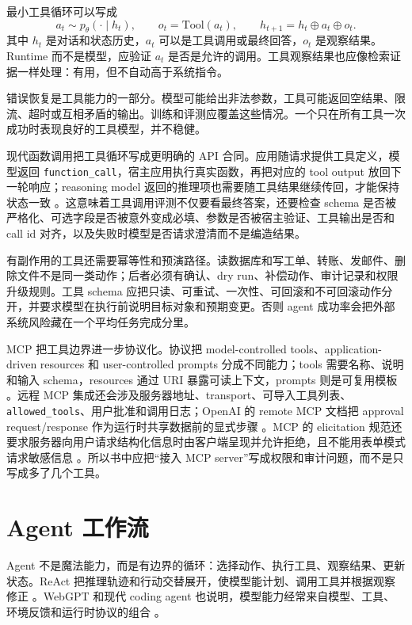 \documentclass[UTF8,zihao=-4,openany]{ctexbook}
\begin{document}
最小工具循环可以写成
\[
  a_t \sim p_\theta(\cdot \mid h_t), \qquad
  o_t=\mathrm{Tool}(a_t), \qquad
  h_{t+1}=h_t\oplus a_t\oplus o_t .
\]
其中 $h_t$ 是对话和状态历史，$a_t$ 可以是工具调用或最终回答，$o_t$ 是观察结果。Runtime 而不是模型，应验证 $a_t$ 是否是允许的调用。工具观察结果也应像检索证据一样处理：有用，但不自动高于系统指令。

错误恢复是工具能力的一部分。模型可能给出非法参数，工具可能返回空结果、限流、超时或互相矛盾的输出。训练和评测应覆盖这些情况。一个只在所有工具一次成功时表现良好的工具模型，并不稳健。

现代函数调用把工具循环写成更明确的 API 合同。应用随请求提供工具定义，模型返回 \texttt{function\_call}，宿主应用执行真实函数，再把对应的 tool output 放回下一轮响应；reasoning model 返回的推理项也需要随工具结果继续传回，才能保持状态一致 \cite{openai2026functioncalling}。这意味着工具调用评测不仅要看最终答案，还要检查 schema 是否被严格化、可选字段是否被意外变成必填、参数是否被宿主验证、工具输出是否和 call id 对齐，以及失败时模型是否请求澄清而不是编造结果。

有副作用的工具还需要幂等性和预演路径。读数据库和写工单、转账、发邮件、删除文件不是同一类动作；后者必须有确认、dry run、补偿动作、审计记录和权限升级规则。工具 schema 应把只读、可重试、一次性、可回滚和不可回滚动作分开，并要求模型在执行前说明目标对象和预期变更。否则 agent 成功率会把外部系统风险藏在一个平均任务完成分里。

MCP 把工具边界进一步协议化。协议把 model-controlled tools、application-driven resources 和 user-controlled prompts 分成不同能力；tools 需要名称、说明和输入 schema，resources 通过 URI 暴露可读上下文，prompts 则是可复用模板 \cite{mcp2025tools,mcp2025resources}。远程 MCP 集成还会涉及服务器地址、transport、可导入工具列表、\texttt{allowed\_tools}、用户批准和调用日志；OpenAI 的 remote MCP 文档把 approval request/response 作为运行时共享数据前的显式步骤 \cite{openai2026remotemcp}。MCP 的 elicitation 规范还要求服务器向用户请求结构化信息时由客户端呈现并允许拒绝，且不能用表单模式请求敏感信息 \cite{mcp2025elicitation}。所以书中应把“接入 MCP server”写成权限和审计问题，而不是只写成多了几个工具。

\section{Agent 工作流}
Agent 不是魔法能力，而是有边界的循环：选择动作、执行工具、观察结果、更新状态。ReAct 把推理轨迹和行动交替展开，使模型能计划、调用工具并根据观察修正 \cite{yao2023react}。WebGPT 和现代 coding agent 也说明，模型能力经常来自模型、工具、环境反馈和运行时协议的组合 \cite{nakano2021webgpt,kimi2025k2}。
\end{document}

